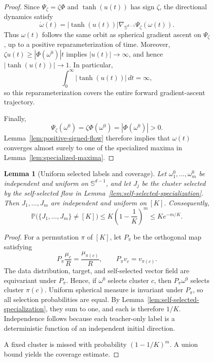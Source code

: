 \documentclass{article}
\newtheorem{lemma}[lemma]{Lemma}
\begin{document}
\begin{figure}
\begin{proof}
Since $\Psi_\zeta=\zeta\Phi$ and $\tanh(u(t))$ has sign $\zeta$, the
directional dynamics satisfy
\[
    {\dot\omega(t)}
    =
    |\tanh(u(t))|
    \nabla_{\mathbb S^{d-1}}\Psi_\zeta({\omega(t)}).
\]
Thus ${\omega(t)}$ follows the same orbit as spherical gradient ascent on
$\Psi_\zeta$, up to a positive reparameterization of time. Moreover,
$\zeta u(t)\geq|\Phi({\omega^0})|t$ implies $|u(t)|\to\infty$, and hence
$|\tanh(u(t))|\to1$. In particular,
\[
    \int_0^\infty |\tanh(u(t))|\,dt=\infty,
\]
so this reparameterization covers the entire forward gradient-ascent
trajectory.

Finally,
\[
    \Psi_\zeta({\omega^0})
    =
    \zeta\Phi({\omega^0})
    =
    |\Phi({\omega^0})|
    >0.
\]
Lemma~\ref{lem:positive-signed-flow} therefore implies that ${\omega(t)}$
converges almost surely to one of the specialized maxima in
Lemma~\ref{lem:specialized-maxima}.
\end{proof}



\begin{lemma}[Uniform selected labels and coverage]
\label{lem:uniform-cluster-coverage}
Let ${\omega_1^0,\ldots,\omega_m^0}$ be independent and uniform on
$\mathbb S^{d-1}$, and let $J_j$ be the cluster selected by the self-selected
flow in Lemma~\ref{lem:self-selected-specialization}. Then
$J_1,\ldots,J_m$ are independent and uniform on $[K]$. Consequently,
\[
    \mathbb P\bigl(\{J_1,\ldots,J_m\}\neq[K]\bigr)
    \leq
    K\left(1-\frac1K\right)^m
    \leq
    Ke^{-m/K}.
\]
\end{lemma}

\begin{proof}
For a permutation $\pi$ of $[K]$, let $P_\pi$ be the orthogonal map satisfying
\[
    P_\pi{\frac{\mu_c}{R}}
    =
    {\frac{\mu_{\pi(c)}}{R}},
    \qquad
    P_\pi{v_c}
    =
    {v_{\pi(c)}}.
\]
The data distribution, target, and self-selected vector field are equivariant
under $P_\pi$. Hence, if ${\omega^0}$ selects cluster $c$, then $P_\pi {\omega^0}$ selects
cluster $\pi(c)$. Uniform spherical measure is invariant under $P_\pi$, so
all selection probabilities are equal. By
Lemma~\ref{lem:self-selected-specialization}, they sum to one, and each is
therefore $1/K$. Independence follows because each teacher-only label is a
deterministic function of an independent initial direction.

A fixed cluster is missed with probability $(1-1/K)^m$. A union bound yields
the coverage estimate.
\end{proof}


\end{figure}
\end{document}
